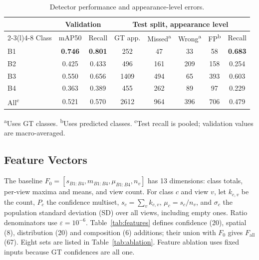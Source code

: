 \documentclass[conference,a4paper]{IEEEtran}
\begin{document}
\begin{table}[!tb]
  \centering
  \footnotesize
  \renewcommand{\arraystretch}{1.13}
  \setlength{\tabcolsep}{2.6pt}
  \caption{Detector performance and appearance-level errors.}
  \label{tab:yolo}
  \begin{tabular*}{\columnwidth}{@{\extracolsep{\fill}}lccccccc@{}}
    \toprule
      & \multicolumn{2}{c}{Validation} & \multicolumn{5}{c}{Test split, appearance level} \\
    \cmidrule(lr){2-3}\cmidrule(l){4-8}
    Class & mAP50 & Recall & GT app. & Missed\textsuperscript{a} & Wrong\textsuperscript{a} & FP\textsuperscript{b} & Recall \\
    \midrule
    B1  & \textbf{0.746} & \textbf{0.801} &  252 &  47 &  33 &  58 & \textbf{0.683} \\
    B2  & 0.425          & 0.433          &  496 & 161 & 209 & 158 & 0.254          \\
    B3  & 0.550          & 0.656          & 1409 & 494 &  65 & 393 & 0.603          \\
    B4  & 0.363          & 0.389          &  455 & 262 &  89 &  97 & 0.229          \\
    All\textsuperscript{c} & 0.521          & 0.570          & 2612 & 964 & 396 & 706 & 0.479          \\
    \bottomrule
  \end{tabular*}
\par\vspace{1pt}
  \begin{minipage}{\columnwidth}
    \footnotesize\raggedright
    \textsuperscript{a}Uses GT classes. \textsuperscript{b}Uses predicted classes. \textsuperscript{c}Test recall is pooled; validation values are macro-averaged.
  \end{minipage}
\end{table}

\subsection{Feature Vectors}
The baseline $F_0=[s_{B1:B4},m_{B1:B4},\mu_{B1:B4},n_v]$ has 13 dimensions:
class totals, per-view maxima and means, and view count. For class $c$ and view
$v$, let $k_{c,v}$ be the count, $P_c$ the confidence multiset,
$s_c=\sum_v k_{c,v}$, $\mu_c=s_c/n_v$, and $\sigma_c$ the population standard deviation (SD) over
all views, including empty ones. Ratio denominators use $\varepsilon=10^{-6}$.
Table~\ref{tab:features} defines confidence (20), spatial (8), distribution
(20) and composition (6) additions; their union with $F_0$ gives $F_{\text{all}}$
(67). Eight sets are listed in Table~\ref{tab:ablation}. Feature ablation uses
fixed inputs because GT confidences are all one.
\end{document}

